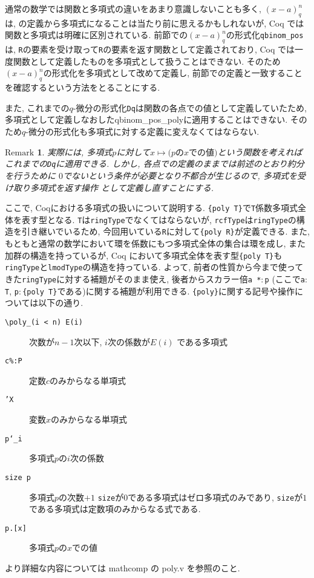 \documentclass[11pt]{jsreport}
\theoremstyle{mystyle}
\newtheorem{rmk}[df]{$\textrm{Remark}$}
\newcommand{\brmk}{\begin{rmk}}
\newcommand{\ermk}{\end{rmk}}
\newcommand{\0}{\textbf{0}}
\begin{document}
通常の数学では関数と多項式の違いをあまり意識しないことも多く, $(x - a)^n_q$は, \cite{Kac}の定義から多項式になることは当たり前に思えるかもしれないが, Coq では関数と多項式は明確に区別されている. 前節での$(x - a)^n_q$の形式化{\tt qbinom\_pos}は, {\tt R}の要素を受け取って{\tt R}の要素を返す関数として定義されており, Coq では一度関数として定義したものを多項式として扱うことはできない. そのため$(x - a)^n_q$の形式化を多項式として改めて定義し, 前節での定義と一致することを確認するという方法をとることにする. 

また, これまでの$q$-微分の形式化{\tt Dq}は関数の各点での値として定義していたため, 多項式として定義しなおした{qbinom\_pos\_poly}に適用することはできない. そのため$q$-微分の形式化も多項式に対する定義に変えなくてはならない. 
\brmk
  実際には, 多項式$p$に対して$x \mapsto \text{($p$の$x$での値)}$という関数を考えれば
  これまでの{\tt Dq}に適用できる. しかし, 各点での定義のままでは前述のとおり約分を行うために
  $0$でないという条件が必要となり不都合が生じるので, 多項式を受け取り多項式を返す操作
  として定義し直すことにする. 
\ermk
ここで, Coqにおける多項式の扱いについて説明する. 
{\tt \{poly T\}}で{\tt T}係数多項式全体を表す型となる. {\tt T}は{\tt ringType}でなくてはならないが, {\tt rcfType}は{\tt ringType}の構造を引き継いでいるため, 今回用いている{\tt R}に対して{\tt \{poly R\}}が定義できる. 
また, もともと通常の数学において環を係数にもつ多項式全体の集合は環を成し, また加群の構造を持っているが, Coq において多項式全体を表す型{\tt \{poly T\}}も{\tt ringType}と{\tt lmodType}の構造を持っている. よって, 前者の性質から今まで使ってきた{\tt ringType}に対する補題がそのまま使え, 後者からスカラー倍{\tt a *$\colon$p} (ここで{\tt a$\colon$T}, 
{\tt p$\colon$\{poly T\}}である)に関する補題が利用できる. {\tt \{poly\}}に関する記号や操作については以下の通り. 
\begin{description}
  \item[\tt \textbackslash poly\_(i < n) E(i)] 次数が$n - 1$次以下, $i$次の係数が$E(i)$
    である多項式
  \item[\tt c\%:P] 定数$c$のみからなる単項式
  \item[\tt 'X] 変数$x$のみからなる単項式
  \item[\tt p`\_i] 多項式$p$の$i$次の係数 
  \item[\tt size p] 多項式$p$の次数$+1$
    {\tt size}が$0$である多項式はゼロ多項式のみであり, 
    {\tt size}が$1$である多項式は定数項のみからなる式である. 
  \item[{\tt p.[x]}] 多項式$p$の$x$での値 
\end{description}
より詳細な内容については mathcomp の poly.v を参照のこと. 
\end{document}
